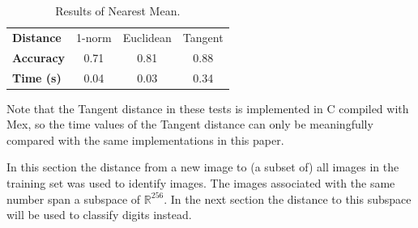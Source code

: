 \begin{table}[H]
    \centering
    \caption{Results of Nearest Mean.}\label{tab:mean_anthon}
    \begin{tabular}{l c c c}
        \toprule
        \textbf{Distance} & 1-norm & Euclidean & Tangent \\
        \textbf{Accuracy} & 0.71   & 0.81      & 0.88    \\
        \textbf{Time (s)} & 0.04   & 0.03      & 0.34    \\
        \bottomrule
    \end{tabular}
\end{table}
Note that the Tangent distance in these tests is implemented in C compiled with Mex, so the time values of the Tangent distance can only be meaningfully compared with the same implementations in this paper.

In this section the distance from a new image to (a subset of) all images in the training set was used to identify images.
The images associated with the same number span a subspace of \(\mathbb{R}^{256}\).
In the next section the distance to this subspace will be used to classify digits instead.